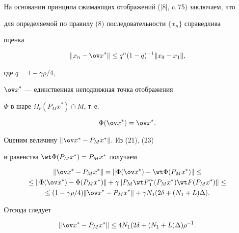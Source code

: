 На основании принципа сжимающих отображений ([8], c.\,75) заключаем, что


для определяемой по правилу (8) последовательности $\{ x_n \}$ справедлива


оценка


\begin{equation}


\Vert x_n -{\ov x}^* \Vert \leq


q^n (1-q)^{-1} \Vert x_0- x_1 \Vert,


\end{equation}


где $q=1-\gamma \rho/4$,


${\ov x}^*$ --- единственная неподвижная точка отображения


$\Phi$ в шаре $\Omega_r (P_M x^*) \cap M$, т.\,е.


\begin{equation}


\Phi ({\ov x}^*)={\ov x}^*.


\end{equation}


Оценим величину $\Vert {\ov x}{}^*- P_M x^* \Vert$. Из (21), (23)


и равенства ${\wt \Phi}(P_M x^*)=P_M x^*$ получаем


\begin{multline*}


\Vert {\ov x}{}^* - P_M x^* \Vert =


\Vert \Phi ({\ov x}{}^*) - {\wt \Phi}(P_M x^*) \Vert \leq \\


%


\leq


\Vert \Phi ({\ov x}{}^*) -\Phi(P_M x^*) \Vert +


\gamma \Vert P_M {\wt F}{}_1^{\prime *}(P_M x^*)


{\wt F}(P_M x^*) \Vert \leq \\


%


\leq (1-\gamma \rho/4)\Vert {\ov x}{}^* -P_M x^* \Vert+


\gamma N_1 (2\delta + (N_1+L)\Delta).


\end{multline*}


Отсюда следует


\begin{equation}


\Vert {\ov x}{}^* -P_M x^* \Vert \leq


4 N_1 (2\delta + (N_1+L)\Delta) \rho^{-1}.


\end{equation}


